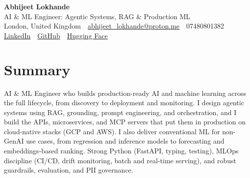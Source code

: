 \documentclass[10pt,a4paper]{article}
\newcommand{\sep}{\,\textcolor{accent!60}{\textbar}\,}
\begin{document}
\begin{center}
  {\fontsize{24}{26}\selectfont\bfseries Abhijeet Lokhande}\\[3pt]
  {\color{accent}\large AI \& ML Engineer: Agentic Systems, RAG \& Production ML}\\[5pt]
  {\small
    London, United Kingdom \sep
    \href{mailto:abhijeet_lokhande@proton.me}{abhijeet\_lokhande@proton.me} \sep
    07480801382 \\[2pt]
    \href{https://www.linkedin.com/in/ablds/}{LinkedIn} \sep
    \href{https://github.com/abhijeetscode}{GitHub} \sep
    \href{https://huggingface.co/ab-ai}{Hugging Face}
  }
\end{center}
\vspace{2pt}

\section{Summary}
AI \& ML Engineer who builds production-ready AI and machine learning across the full lifecycle, from discovery to deployment and monitoring. I design agentic systems using RAG, grounding, prompt engineering, and orchestration, and I build the APIs, microservices, and MCP servers that put them in production on cloud-native stacks (GCP and AWS). I also deliver conventional ML for non-GenAI use cases, from regression and inference models to forecasting and embeddings-based ranking. Strong Python (FastAPI, typing, testing), MLOps discipline (CI/CD, drift monitoring, batch and real-time serving), and robust guardrails, evaluation, and PII governance.

\end{document}
